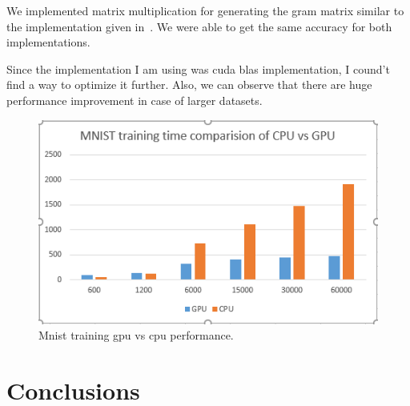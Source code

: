 \documentclass{article}
\begin{document}
We implemented matrix multiplication for generating the gram matrix similar to the implementation given in~\cite{matrixmuleg}.
We were able to get the same accuracy for both implementations.

Since the implementation I am using was cuda blas implementation, I cound't find a way to optimize it further.  
Also, we can observe that there are huge performance improvement in case of larger datasets.

\begin{figure}[ht!]
  \centering
  \includegraphics[width=1\textwidth]{images/gpuvscpu}
  \caption{Mnist training gpu vs cpu performance.\label{fig:gpuvscpu}}
\end{figure}

\section{Conclusions}




\end{document}

